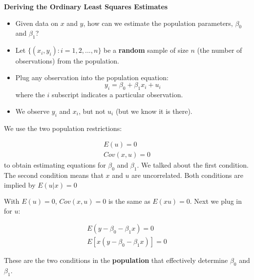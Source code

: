 \documentclass[notes=show]{beamer}
\begin{document}
\begin{frame}[plain]

 \begin{center}
  \textbf{Deriving the Ordinary Least Squares Estimates}
 \end{center}
 \begin{itemize}
  \item Given data on $x$ and $y$, how can we estimate the population parameters, $\beta _{0}$ and $\beta _{1}$?

  \item Let $\{(x_{i},y_{i}):i=1,2,...,n\}$ be a \textbf{random} sample of size $n$ (the number of observations) from the population.
  \item Plug any observation into the population equation:
   \begin{equation}
    y_{i}=\beta _{0}+\beta _{1}x_{i}+u_{i}
   \end{equation}
    where the $i$ subscript indicates a particular observation.
  \item We observe $y_{i}$ and $x_{i}$, but not $u_{i}$ (but we know it is there).
 \end{itemize}
\end{frame}

\begin{frame}[plain]
We use the two population restrictions:

 \begin{eqnarray*}
  E(u)=0 \\
  Cov(x,u)=0
 \end{eqnarray*}
to obtain estimating equations for $\beta _{0}$ and $\beta _{1}$. We talked about the first condition. The second condition means that $x$ and $u$ are uncorrelated. Both conditions are implied by $E(u|x)=0$
\end{frame}

\begin{frame}[plain]
 With $E(u)=0$, $Cov(x,u)=0$ is the same as $E(xu)=0$. Next we plug in for $u$:

 \begin{eqnarray*}
  E(y-\beta _{0}-\beta _{1}x) =0 \\
  E[x(y-\beta _{0}-\beta _{1}x)] =0
 \end{eqnarray*}

 These are the two conditions in the \textbf{population} that effectively determine $\beta _{0}$ and $\beta _{1}$.

\end{frame}
\end{document}
